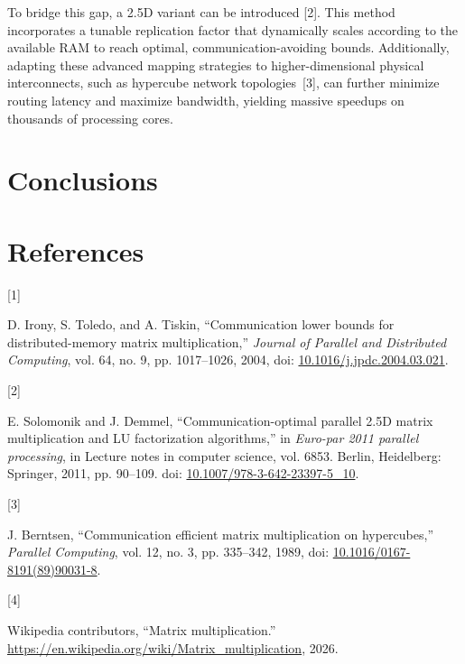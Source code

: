 \documentclass[
  12pt,
]{article}
\newlength{\cslhangindent}
\newlength{\csllabelwidth}
\newenvironment{CSLReferences}[2] %
 {\begin{list}{}{%
  \setlength{\itemindent}{0pt}
  \setlength{\leftmargin}{0pt}
  \setlength{\parsep}{0pt}
  \ifodd #1
   \setlength{\leftmargin}{\cslhangindent}
   \setlength{\itemindent}{-1\cslhangindent}
  \fi
  \setlength{\itemsep}{#2\baselineskip}}}
 {\end{list}}
\newcommand{\CSLLeftMargin}[1]{\parbox[t]{\csllabelwidth}{\strut#1\strut}}
\newcommand{\CSLRightInline}[1]{\parbox[t]{\linewidth - \csllabelwidth}{\strut#1\strut}}
\begin{document}
To bridge this gap, a 2.5D variant can be introduced {[}2{]}. This
method incorporates a tunable replication factor that dynamically scales
according to the available RAM to reach optimal, communication-avoiding
bounds. Additionally, adapting these advanced mapping strategies to
higher-dimensional physical interconnects, such as hypercube network
topologies~{[}3{]}, can further minimize routing latency and maximize
bandwidth, yielding massive speedups on thousands of processing cores.

\section{Conclusions}\label{conclusions}

\section*{References}\label{references}

\label{refs}
\begin{CSLReferences}{0}{0}
\CSLLeftMargin{{[}1{]} }%
\CSLRightInline{D. Irony, S. Toledo, and A. Tiskin, {``Communication
lower bounds for distributed-memory matrix multiplication,''}
\emph{Journal of Parallel and Distributed Computing}, vol. 64, no. 9,
pp. 1017--1026, 2004, doi:
\href{https://doi.org/10.1016/j.jpdc.2004.03.021}{10.1016/j.jpdc.2004.03.021}.}

\CSLLeftMargin{{[}2{]} }%
\CSLRightInline{E. Solomonik and J. Demmel, {``Communication-optimal
parallel 2.5D matrix multiplication and LU factorization algorithms,''}
in \emph{Euro-par 2011 parallel processing}, in Lecture notes in
computer science, vol. 6853. Berlin, Heidelberg: Springer, 2011, pp.
90--109. doi:
\href{https://doi.org/10.1007/978-3-642-23397-5_10}{10.1007/978-3-642-23397-5\_10}.}

\CSLLeftMargin{{[}3{]} }%
\CSLRightInline{J. Berntsen, {``Communication efficient matrix
multiplication on hypercubes,''} \emph{Parallel Computing}, vol. 12, no.
3, pp. 335--342, 1989, doi:
\href{https://doi.org/10.1016/0167-8191(89)90031-8}{10.1016/0167-8191(89)90031-8}.}

\CSLLeftMargin{{[}4{]} }%
\CSLRightInline{Wikipedia contributors, {``Matrix multiplication.''}
\url{https://en.wikipedia.org/wiki/Matrix_multiplication}, 2026.}

\end{CSLReferences}
\end{document}
